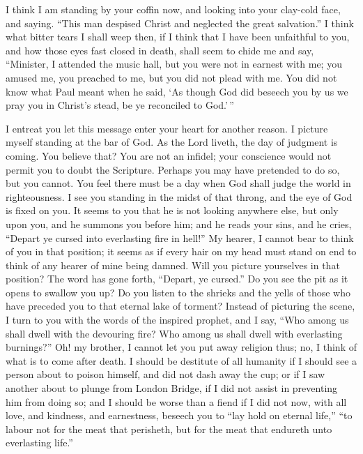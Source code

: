 \documentclass[
]{book}
\begin{document}
I think I am standing by your coffin now, and looking into your clay-cold face, and saying. ``This man despised Christ and neglected the great salvation.'' I think what bitter tears I shall weep then, if I think that I have been unfaithful to you, and how those eyes fast closed in death, shall seem to chide me and say, ``Minister, I attended the music hall, but you were not in earnest with me; you amused me, you preached to me, but you did not plead with me. You did not know what Paul meant when he said, `As though God did beseech you by us we pray you in Christ's stead, be ye reconciled to God.'\,''

I entreat you let this message enter your heart for another reason. I picture myself standing at the bar of God. As the Lord liveth, the day of judgment is coming. You believe that? You are not an infidel; your conscience would not permit you to doubt the Scripture. Perhaps you may have pretended to do so, but you cannot. You feel there must be a day when God shall judge the world in righteousness. I see you standing in the midst of that throng, and the eye of God is fixed on you. It seems to you that he is not looking anywhere else, but only upon you, and he summons you before him; and he reads your sins, and he cries, ``Depart ye cursed into everlasting fire in hell!'' My hearer, I cannot bear to think of you in that position; it seems as if every hair on my head must stand on end to think of any hearer of mine being damned. Will you picture yourselves in that position? The word has gone forth, ``Depart, ye cursed.'' Do you see the pit as it opens to swallow you up? Do you listen to the shrieks and the yells of those who have preceded you to that eternal lake of torment? Instead of picturing the scene, I turn to you with the words of the inspired prophet, and I say, ``Who among us shall dwell with the devouring fire? Who among us shall dwell with everlasting burnings?'' Oh! my brother, I cannot let you put away religion thus; no, I think of what is to come after death. I should be destitute of all humanity if I should see a person about to poison himself, and did not dash away the cup; or if I saw another about to plunge from London Bridge, if I did not assist in preventing him from doing so; and I should be worse than a fiend if I did not now, with all love, and kindness, and earnestness, beseech you to ``lay hold on eternal life,'' ``to labour not for the meat that perisheth, but for the meat that endureth unto everlasting life.''
\end{document}
